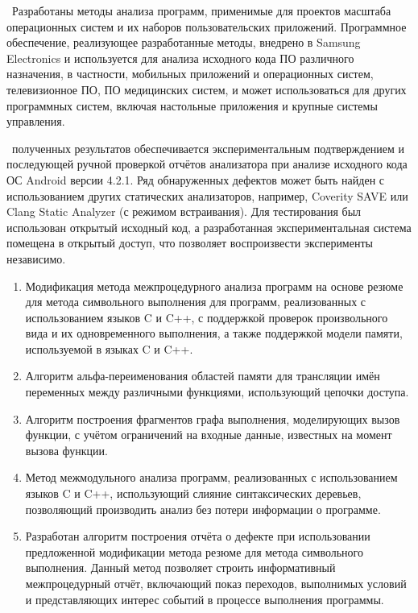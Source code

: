 {\influence\ Разработаны методы анализа программ, применимые для проектов масштаба операционных систем и их наборов пользовательских приложений. Программное обеспечение, реализующее разработанные методы, внедрено в Samsung Electronics и используется для анализа исходного кода ПО различного назначения, в частности, мобильных приложений и операционных систем, телевизионное ПО, ПО медицинских систем, и может использоваться для других программных систем, включая настольные приложения и крупные системы управления. 

\reliability\ полученных результатов обеспечивается экспериментальным подтверждением и последующей ручной проверкой отчётов анализатора при анализе исходного кода ОС Android версии 4.2.1. Ряд обнаруженных дефектов может быть найден с использованием других статических анализаторов, например, Coverity SAVE или Clang Static Analyzer (с режимом встраивания). Для тестирования был использован открытый исходный код, а разработанная экспериментальная система помещена в открытый доступ, что позволяет воспроизвести эксперименты независимо.

\begin{enumerate}
  \item Модификация метода межпроцедурного анализа программ на основе резюме для метода символьного выполнения для программ, реализованных с использованием языков C и C++, с поддержкой проверок произвольного вида и их одновременного выполнения, а также поддержкой модели памяти, используемой в языках C и C++.
  \item Алгоритм альфа-переименования областей памяти для трансляции имён переменных между различными функциями, использующий цепочки доступа.
  \item Алгоритм построения фрагментов графа выполнения, моделирующих вызов функции, с учётом ограничений на входные данные, известных на момент вызова функции.
  \item Метод межмодульного анализа программ, реализованных с использованием языков C и C++, использующий слияние синтаксических деревьев, позволяющий производить анализ без потери информации о программе.
  \item Разработан алгоритм построения отчёта о дефекте при использовании предложенной модификации метода резюме для метода символьного выполнения. Данный метод позволяет строить информативный межпроцедурный отчёт, включающий показ переходов, выполнимых условий и представляющих интерес событий в процессе выполнения программы.
\end{enumerate}

}

